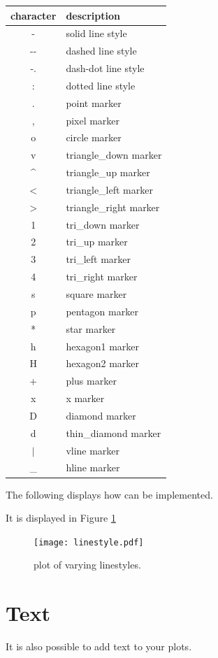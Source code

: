 \begin{table}[H]
\centering
\begin{tabular}{c|l}
    character & description \\
    \hline
    - & solid line style \\
    -{}- & dashed line style\\
    -. & dash-dot line style \\
    : & dotted line style \\
    . & point marker \\
    , & pixel marker \\
    o & circle marker \\
    v & triangle\_down marker \\
    \^{} & triangle\_up marker \\
    $<$ & triangle\_left marker \\
    $>$ & triangle\_right marker \\
    1 & tri\_down marker \\
    2 & tri\_up marker \\
    3 & tri\_left marker \\
    4 & tri\_right marker \\
    s & square marker \\
    p & pentagon marker \\
    * & star marker \\
    h & hexagon1 marker \\
    H & hexagon2 marker \\
    + & plus marker \\
    x & x marker \\
    D & diamond marker \\
    d & thin\_diamond marker \\
    $|$ & vline marker \\
    \_{} & hline marker \\
\end{tabular}
\end{table}


The following displays how  can be implemented. 

It is displayed in Figure \ref{linestyle}


\begin{figure} 
\texttt{[image: linestyle.pdf]}
\caption{plot of varying linestyles.}
\label{linestyle} 
\end{figure}


\section*{Text}
It is also possible to add text to your plots. 

